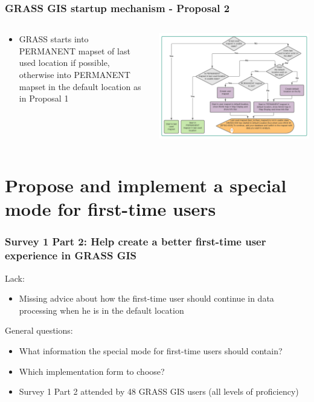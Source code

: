 \documentclass[aspectratio=169]{beamer}
\begin{document}
\begin{frame}
\frametitle{GRASS GIS startup mechanism - Proposal 2}
\begin{columns}
\begin{column}{.35\textwidth}
\begin{itemize}
\item GRASS starts into PERMANENT mapset of last used location if possible, otherwise into PERMANENT mapset in the default location as in Proposal 1
\end{itemize}
\end{column}
\begin{column}{.65\textwidth}
\includegraphics[width=\textwidth]{pictures/normal_user_diagram2.PNG} \hspace*{4cm}
\end{column}
\end{columns}
\end{frame} 

\section{Propose and implement a special mode for first-time users}

\begin{frame}
\frametitle{Survey 1 Part 2: Help create a better first-time user experience in GRASS GIS}
Lack:
\begin{itemize}
\item Missing advice about how the first-time user should continue in data processing when he is in the default location
\end{itemize}

\vspace{0.5cm}
General questions:
\begin{itemize}
\item What information the special mode for first-time users should contain?
\item Which implementation form to choose?
\vspace{0.5cm}
\item Survey 1 Part 2 attended by 48 GRASS GIS users (all levels of proficiency)
\end{itemize}
\end{frame}
\end{document}
